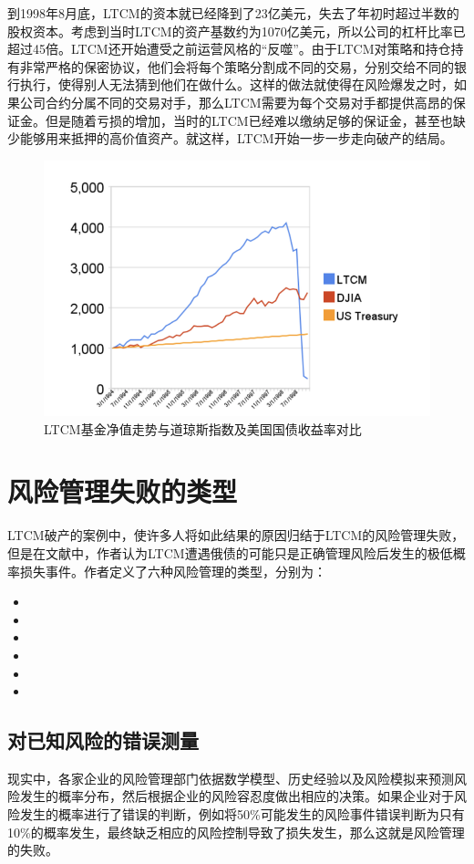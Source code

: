 到1998年8月底，LTCM的资本就已经降到了23亿美元，失去了年初时超过半数的股权资本。考虑到当时LTCM的资产基数约为1070亿美元，所以公司的杠杆比率已超过45倍。LTCM还开始遭受之前运营风格的“反噬”。由于LTCM对策略和持仓持有非常严格的保密协议，他们会将每个策略分割成不同的交易，分别交给不同的银行执行，使得别人无法猜到他们在做什么。这样的做法就使得在风险爆发之时，如果公司合约分属不同的交易对手，那么LTCM需要为每个交易对手都提供高昂的保证金。但是随着亏损的增加，当时的LTCM已经难以缴纳足够的保证金，甚至也缺少能够用来抵押的高价值资产。就这样，LTCM开始一步一步走向破产的结局。
\begin{figure}[H]
    \centering
    \includegraphics[width=\linewidth]{img/图片 1.png}
    \caption{LTCM基金净值走势与道琼斯指数及美国国债收益率对比}
\end{figure}
\section{风险管理失败的类型}
LTCM破产的案例中，使许多人将如此结果的原因归结于LTCM的风险管理失败，但是在文献中，作者认为LTCM遭遇俄债的可能只是正确管理风险后发生的极低概率损失事件。作者定义了六种风险管理的类型，分别为：
\begin{itemize}
    \item {}
    \item {}
    \item {}
    \item {}
    \item {}
    \item {}
\end{itemize}
\subsection{对已知风险的错误测量}\label{sec:1}
现实中，各家企业的风险管理部门依据数学模型、历史经验以及风险模拟来预测风险发生的概率分布，然后根据企业的风险容忍度做出相应的决策。如果企业对于风险发生的概率进行了错误的判断，例如将50\%可能发生的风险事件错误判断为只有10\%的概率发生，最终缺乏相应的风险控制导致了损失发生，那么这就是风险管理的失败。

